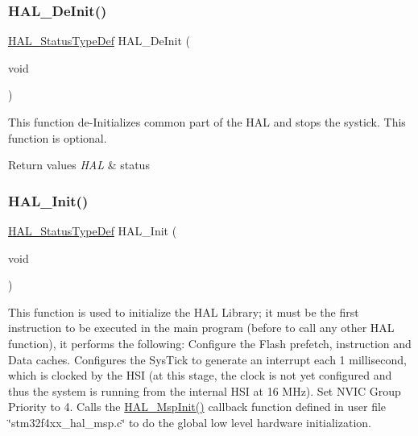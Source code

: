 \subsubsection{\texorpdfstring{H\+A\+L\+\_\+\+De\+Init()}{HAL\_DeInit()}}
{\footnotesize\ttfamily \mbox{\hyperlink{stm32f4xx__hal__def_8h_a63c0679d1cb8b8c684fbb0632743478f}{H\+A\+L\+\_\+\+Status\+Type\+Def}} H\+A\+L\+\_\+\+De\+Init (\begin{DoxyParamCaption}\item[{void}]{ }\end{DoxyParamCaption})}



This function de-\/\+Initializes common part of the H\+AL and stops the systick. This function is optional. ~\newline
 


\begin{DoxyRetVals}{Return values}
{\em H\+AL} & status \\
\hline
\end{DoxyRetVals}
\mbox{\label{group___h_a_l___exported___functions___group1_gaecac54d350c3730e6831eb404e557dc4}} 
\subsubsection{\texorpdfstring{H\+A\+L\+\_\+\+Init()}{HAL\_Init()}}
{\footnotesize\ttfamily \mbox{\hyperlink{stm32f4xx__hal__def_8h_a63c0679d1cb8b8c684fbb0632743478f}{H\+A\+L\+\_\+\+Status\+Type\+Def}} H\+A\+L\+\_\+\+Init (\begin{DoxyParamCaption}\item[{void}]{ }\end{DoxyParamCaption})}



This function is used to initialize the H\+AL Library; it must be the first instruction to be executed in the main program (before to call any other H\+AL function), it performs the following\+: Configure the Flash prefetch, instruction and Data caches. Configures the Sys\+Tick to generate an interrupt each 1 millisecond, which is clocked by the H\+SI (at this stage, the clock is not yet configured and thus the system is running from the internal H\+SI at 16 M\+Hz). Set N\+V\+IC Group Priority to 4. Calls the \mbox{\hyperlink{group___h_a_l___exported___functions___group1_ga07e099a69ab23e79be8b7a80505de519}{H\+A\+L\+\_\+\+Msp\+Init()}} callback function defined in user file \char`\"{}stm32f4xx\+\_\+hal\+\_\+msp.\+c\char`\"{} to do the global low level hardware initialization. 


